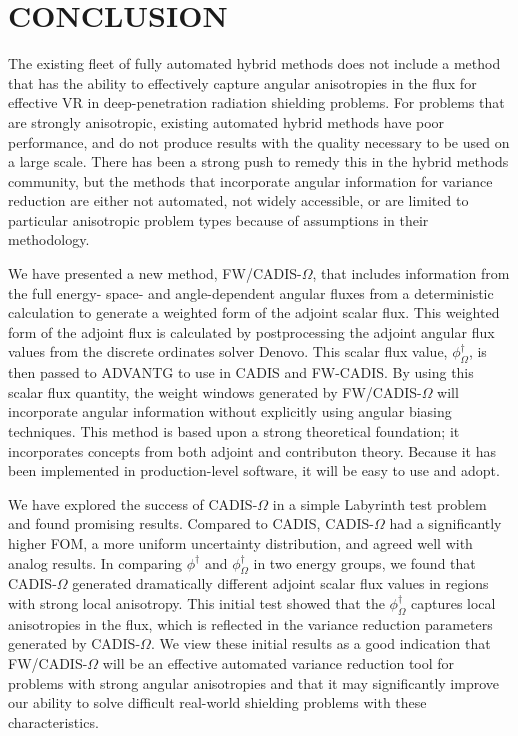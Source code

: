 \documentclass[12pt]{article}
\begin{document}
\section{CONCLUSION} 
\label{sect::conclusion}

The existing fleet of fully automated hybrid methods does not include a method that has the ability to effectively capture angular anisotropies in the flux for effective VR in deep-penetration radiation shielding problems. For problems that are strongly anisotropic, existing automated hybrid methods have poor performance, and do not produce results with the quality necessary to be used on a large scale. There has been a strong push to remedy this in the hybrid methods community, but the methods that incorporate angular information for variance reduction are either not automated, not widely accessible, or are limited to particular anisotropic problem types because of assumptions in their methodology. 

We have presented a new method, FW/CADIS-$\Omega$, that includes information from the full energy- space- and angle-dependent angular fluxes from a deterministic calculation to generate a weighted form of the adjoint scalar flux. This weighted form of the adjoint flux is calculated by postprocessing the adjoint angular flux values from the discrete ordinates solver Denovo. This scalar flux value, $\phi^{\dagger}_{\Omega}$, is then passed to ADVANTG to use in CADIS and FW-CADIS. By using this scalar flux quantity, the weight windows generated by FW/CADIS-$\Omega$ will incorporate angular information without explicitly using angular biasing techniques. This method is based upon a strong theoretical foundation; it incorporates concepts from both adjoint and contributon theory. Because it has been implemented in production-level software, it will be easy to use and adopt. 

We have explored the success of CADIS-$\Omega$ in a simple Labyrinth test problem and found promising results. 
Compared to CADIS, CADIS-$\Omega$ had a significantly higher FOM, a more uniform uncertainty distribution, and agreed well with analog results. 
In comparing $\phi^{\dagger}$ and $\phi^{\dagger}_{\Omega}$ in two energy groups, we found that CADIS-$\Omega$ generated dramatically different adjoint scalar flux values in regions with strong local anisotropy. 
This initial test showed that the $\phi^{\dagger}_{\Omega}$ captures local anisotropies in the flux, which is reflected in the variance reduction parameters generated by CADIS-$\Omega$.
We view these initial results as a good indication that FW/CADIS-$\Omega$ will be an effective automated variance reduction tool for problems with strong angular anisotropies and that it may significantly improve our ability to solve difficult real-world shielding problems with these characteristics. 
\end{document}
